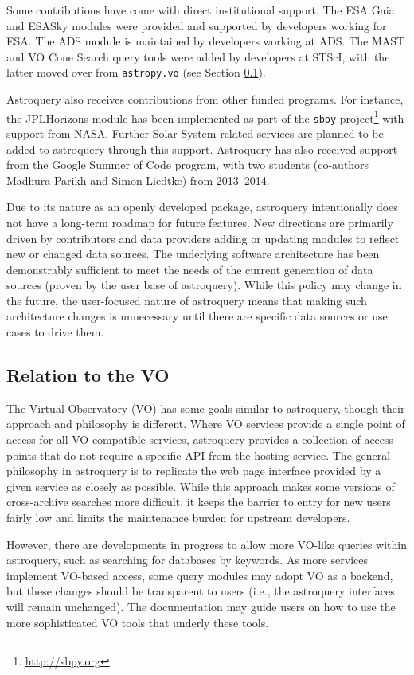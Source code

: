 \documentclass[twocolumn]{aastex62}
\begin{document}
Some contributions have come with direct institutional support.  The ESA Gaia and
ESASky modules were provided and supported by developers working for ESA\@.  The
ADS module is maintained by developers working at ADS. The
MAST and VO Cone Search query tools were added by developers at STScI, with the
latter moved over from \texttt{astropy.vo} (see Section \ref{sec:vo}).

Astroquery also receives contributions from other funded programs. For instance, the
JPLHorizons module has been implemented as part of the \texttt{sbpy}
project\footnote{\url{http://sbpy.org}} with support from NASA. Further Solar
System-related services are planned to be added to astroquery through this
support. Astroquery has also received support from the Google Summer of Code
program, with two students (co-authors Madhura Parikh and Simon Liedtke) from
2013--2014.

Due to its nature as an openly developed package, astroquery intentionally does
not have a long-term roadmap for future features. New directions are primarily
driven by contributors and data providers adding or updating modules to reflect
new or changed data  sources. The underlying software architecture has been
demonstrably sufficient to meet the needs of the  current generation of data
sources (proven by the user base of astroquery).  While this policy may change
in the future, the user-focused nature of astroquery means that making such
architecture changes is unnecessary until there are specific data sources or
use cases to drive them.


\subsection{Relation to the VO}
\label{sec:vo}

The Virtual Observatory (VO) has some goals similar to astroquery,
though their approach and philosophy is different.  Where VO services provide a
single point of access for all VO-compatible services, astroquery
provides a collection of access points that do not require a specific API from
the hosting service.  The general philosophy in astroquery is to
replicate the web page interface provided by a given service as closely as
possible.  While this approach makes some versions of cross-archive searches
more difficult, it keeps the barrier to entry for new users fairly low and limits
the maintenance burden for upstream developers.

However, there are developments in progress to allow more VO-like queries
within astroquery, such as searching for databases by keywords.  As more
services implement VO-based access, some query modules may adopt VO as a backend,
but these changes should be transparent to users (i.e., the astroquery
interfaces will remain unchanged).  The documentation may guide users on how
to use the more sophisticated VO tools that underly these tools.
\end{document}
